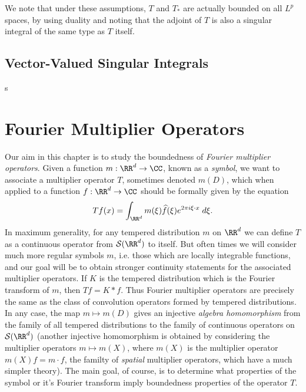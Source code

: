 We note that under these assumptions, $T$ and $T_*$ are actually bounded on all $L^p$ spaces, by using duality and noting that the adjoint of $T$ is also a singular integral of the same type as $T$ itself.



\section{Vector-Valued Singular Integrals}

s



















\chapter{Fourier Multiplier Operators}

Our aim in this chapter is to study the boundedness of \emph{Fourier multiplier operators}. Given a function $m: \RR^d \to \CC$, known as a \emph{symbol}, we want to associate a multiplier operator $T$, sometimes denoted $m(D)$, which when applied to a function $f: \RR^d \to \CC$ should be formally given by the equation
%
\[ Tf(x) = \int_{\RR^d} m(\xi) \widehat{f}(\xi) e^{2 \pi i \xi \cdot x}\; d\xi. \]
%
In maximum generality, for any tempered distribution $m$ on $\RR^d$ we can define $T$ as a continuous operator from $\mathcal{S}(\RR^d)$ to itself. But often times we will consider much more regular symbols $m$, i.e. those which are locally integrable functions, and our goal will be to obtain stronger continuity statements for the associated multiplier operators. If $K$ is the tempered distribution which is the Fourier transform of $m$, then $Tf = K * f$. Thus Fourier multiplier operators are precisely the same as the class of convolution operators formed by tempered distributions. In any case, the map $m \mapsto m(D)$ gives an injective \emph{algebra homomorphism} from the family of all tempered distributions to the family of continuous operators on $\mathcal{S}(\RR^d)$ (another injective homomorphism is obtained by considering the multiplier operators $m \mapsto m(X)$, where $m(X)$ is the multiplier operator $m(X) f = m \cdot f$, the familty of \emph{spatial} multiplier operators, which have a much simpler theory). The main goal, of course, is to determine what properties of the symbol or it's Fourier transform imply boundedness properties of the operator $T$.

